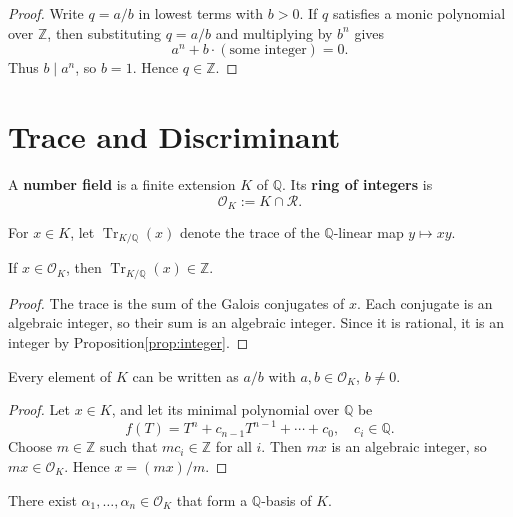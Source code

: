 \begin{proof}
Write \(q = a/b\) in lowest terms with \(b > 0\). If \(q\) satisfies a monic polynomial over \(\mathbb{Z}\), then substituting \(q = a/b\) and multiplying by \(b^n\) gives
\[
a^n + b \cdot (\text{some integer}) = 0.
\]
Thus \(b \mid a^n\), so \(b = 1\). Hence \(q \in \mathbb{Z}\).
\end{proof}



\section{Trace and Discriminant}

\begin{defn}\label{def:ring of integers}
A \textbf{number field} is a finite extension \(K\) of \(\mathbb{Q}\). Its \textbf{ring of integers} is
\[
\mathcal{O}_K := K \cap \mathcal{R}.
\]
\end{defn}

For \(x \in K\), let \(\operatorname{Tr}_{K/\mathbb{Q}}(x)\) denote the trace of the \(\mathbb{Q}\)-linear map \(y \mapsto xy\).

\begin{lemma}
\label{lem:tr_int}
If \(x \in \mathcal{O}_K\), then \(\operatorname{Tr}_{K/\mathbb{Q}}(x) \in \mathbb{Z}\).
\end{lemma}

\begin{proof}
The trace is the sum of the Galois conjugates of \(x\). Each conjugate is an algebraic integer, so their sum is an algebraic integer. Since it is rational, it is an integer by Proposition\ref{prop:integer}.
\end{proof}


\begin{lemma}\label{lem:frac}
Every element of \(K\) can be written as \(a/b\) with \(a, b \in \mathcal{O}_K\), \(b \neq 0\).
\end{lemma}

\begin{proof}
Let \(x \in K\), and let its minimal polynomial over \(\mathbb{Q}\) be
\[
f(T) = T^n + c_{n-1}T^{n-1} + \cdots + c_0, \quad c_i \in \mathbb{Q}.
\]
Choose \(m \in \mathbb{Z}\) such that \(m c_i \in \mathbb{Z}\) for all \(i\). Then \(m x\) is an algebraic integer, so \(m x \in \mathcal{O}_K\). Hence \(x = (m x)/m\).
\end{proof}



\begin{lemma}
There exist \(\alpha_1, \dots, \alpha_n \in \mathcal{O}_K\) that form a \(\mathbb{Q}\)-basis of \(K\).
\end{lemma}

